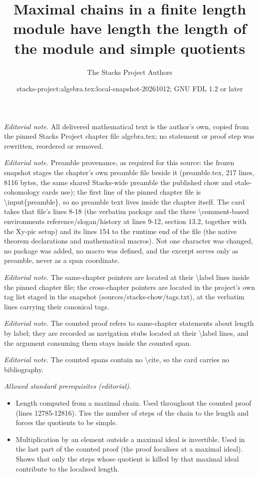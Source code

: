 \documentclass[10pt,a4paper]{amsart}
\title{Maximal chains in a finite length module have length the length of the module and simple quotients}
\author{The Stacks Project Authors}
\date{stacks-project:algebra.tex:local-snapshot-20261012; GNU FDL 1.2 or later}
\theoremstyle{plain}
\theoremstyle{definition}
\theoremstyle{remark}
\numberwithin{equation}{subsection}
\begin{document}
\maketitle
\noindent\textit{Editorial note.} All delivered mathematical text is the author's own, copied from the pinned Stacks Project chapter file algebra.tex; no statement or proof step was rewritten, reordered or removed.\par\medskip
\noindent\textit{Editorial note.} Preamble provenance, as required for this source: the frozen snapshot stages the chapter's own preamble file beside it (preamble.tex, 217 lines, 8116 bytes, the same shared Stacks-wide preamble the published chow and etale-cohomology cards use); the first line of the pinned chapter file is \textbackslash{}input\{preamble\}, so no preamble text lives inside the chapter itself. The card takes that file's lines 8-18 (the verbatim package and the three \textbackslash{}comment-based environments reference/slogan/history at lines 9-12, section 13.2, together with the Xy-pic setup) and its lines 154 to the runtime end of the file (the native theorem declarations and mathematical macros). Not one character was changed, no package was added, no macro was defined, and the excerpt serves only as preamble, never as a span coordinate.\par\medskip
\noindent\textit{Editorial note.} The same-chapter pointers are located at their \textbackslash{}label lines inside the pinned chapter file; the cross-chapter pointers are located in the project's own tag list staged in the snapshot (sources/stacks-chow/tags.txt), at the verbatim lines carrying their canonical tags.\par\medskip
\noindent\textit{Editorial note.} The counted proof refers to same-chapter statements about length by label; they are recorded as navigation stubs located at their \textbackslash{}label lines, and the argument consuming them stays inside the counted span.\par\medskip
\noindent\textit{Editorial note.} The counted spans contain no \textbackslash{}cite, so the card carries no bibliography.\par\medskip
\noindent\textit{Allowed standard prerequisites (editorial).}\begin{itemize}
\item Length computed from a maximal chain. Used throughout the counted proof (lines 12785-12816). Ties the number of steps of the chain to the length and forces the quotients to be simple.
\item Multiplication by an element outside a maximal ideal is invertible. Used in the last part of the counted proof (the proof localises at a maximal ideal). Shows that only the steps whose quotient is killed by that maximal ideal contribute to the localised length.
\end{itemize}\medskip
\end{document}
